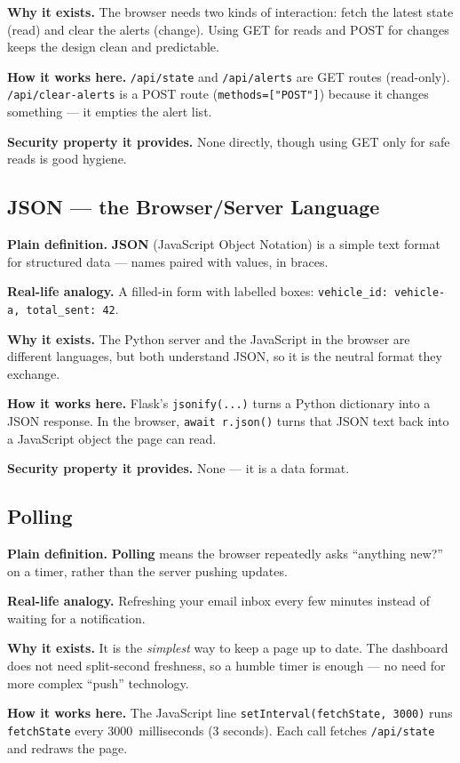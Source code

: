 \documentclass[11pt,a4paper]{article}
\begin{document}
\textbf{Why it exists.} The browser needs two kinds of interaction: fetch the
latest state (read) and clear the alerts (change). Using GET for reads and POST
for changes keeps the design clean and predictable.

\textbf{How it works here.} \texttt{/api/state} and \texttt{/api/alerts} are GET
routes (read-only). \texttt{/api/clear-alerts} is a POST route
(\texttt{methods=["POST"]}) because it changes something --- it empties the alert
list.

\textbf{Security property it provides.} None directly, though using GET only for
safe reads is good hygiene.

\subsection{JSON --- the Browser/Server Language}
\textbf{Plain definition.} \textbf{JSON} (JavaScript Object Notation) is a simple
text format for structured data --- names paired with values, in braces.

\textbf{Real-life analogy.} A filled-in form with labelled boxes:
\texttt{vehicle\_id: vehicle-a, total\_sent: 42}.

\textbf{Why it exists.} The Python server and the JavaScript in the browser are
different languages, but both understand JSON, so it is the neutral format they
exchange.

\textbf{How it works here.} Flask's \texttt{jsonify(...)} turns a Python
dictionary into a JSON response. In the browser, \texttt{await r.json()} turns
that JSON text back into a JavaScript object the page can read.

\textbf{Security property it provides.} None --- it is a data format.

\subsection{Polling}
\textbf{Plain definition.} \textbf{Polling} means the browser repeatedly asks
``anything new?'' on a timer, rather than the server pushing updates.

\textbf{Real-life analogy.} Refreshing your email inbox every few minutes instead
of waiting for a notification.

\textbf{Why it exists.} It is the \emph{simplest} way to keep a page up to date.
The dashboard does not need split-second freshness, so a humble timer is enough
--- no need for more complex ``push'' technology.

\textbf{How it works here.} The JavaScript line \texttt{setInterval(fetchState,
3000)} runs \texttt{fetchState} every 3000~milliseconds (3 seconds). Each call
fetches \texttt{/api/state} and redraws the page.
\end{document}
